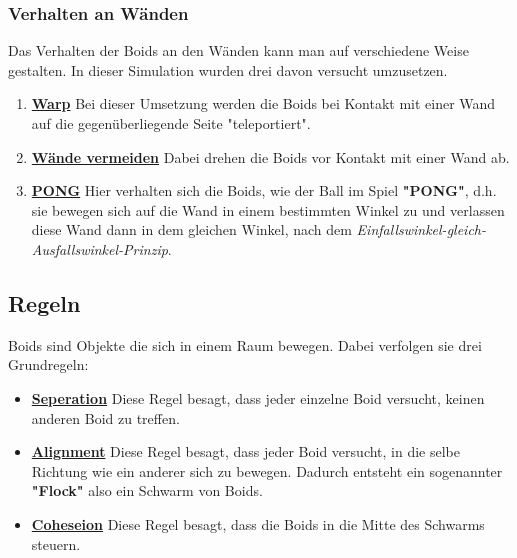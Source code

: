 \documentclass[a4paper, hidelinks, 12pt]{article}
\begin{document}
\subsubsection{Verhalten an Wänden}\label{sec:Verhalten}
Das Verhalten der Boids an den Wänden kann man auf verschiedene Weise gestalten. In dieser Simulation wurden drei davon versucht umzusetzen. 
\begin{enumerate}
\item \underline{\textbf{Warp}}\linebreak\label{sec:Warp}
Bei dieser Umsetzung werden die Boids bei Kontakt mit einer Wand auf die gegenüberliegende Seite "teleportiert".
			
\item \underline{\textbf{Wände vermeiden}}\linebreak\label{sec:AvoidWall}
Dabei drehen die Boids vor Kontakt mit einer Wand ab.
			
\item \underline{\textbf{PONG}}\linebreak\label{sec:Pong}
Hier verhalten sich die Boids, wie der Ball im Spiel \textbf{"PONG"}\cite{andysarcade2022}, d.h. sie bewegen sich auf die Wand in einem bestimmten Winkel zu und verlassen diese Wand dann in dem gleichen Winkel, nach dem \emph{Einfallswinkel-gleich-Ausfallswinkel-Prinzip}.
\end{enumerate}

\subsection{Regeln}\label{sec:Regel}
Boids sind Objekte die sich in einem Raum bewegen. Dabei verfolgen sie drei Grundregeln\cite{Lague2022}:
\begin{itemize}
\item\textbf{\underline{Seperation}}\linebreak\label{sec:Seperation}
Diese Regel besagt, dass jeder einzelne Boid versucht, keinen anderen Boid zu treffen. 
\item\textbf{\underline{Alignment}}\linebreak\label{sec:Alignment}
Diese Regel besagt, dass jeder Boid versucht, in die selbe Richtung wie ein anderer sich zu bewegen. Dadurch entsteht ein sogenannter \textbf{"Flock"} also ein Schwarm von Boids.
\item\textbf{\underline{Coheseion}}\linebreak\label{sec:Cohesion}
Diese Regel besagt, dass die Boids in die Mitte des Schwarms steuern.
\end{itemize}
	
\end{document}
